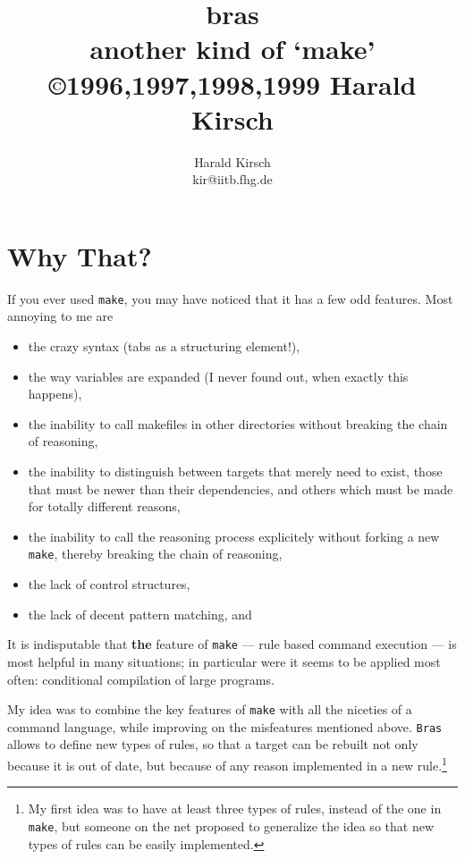 \documentclass[12pt]{article}
\title{\textsf{bras}\\
another kind of `make'\\
\small \copyright 1996,1997,1998,1999 Harald Kirsch}
\author{\relax
Harald Kirsch\\
kir@iitb.fhg.de}
\newcommand{\Bras}{\texttt{Bras}}
\newcommand{\make}{\texttt{make}}
\begin{document}
\maketitle
\tableofcontents







\section{Why That?}
If you ever used \texttt{make}, you may have noticed that it has a few
odd features. Most annoying to me are

\begin{itemize}
\item 
the crazy syntax (tabs as a structuring element!),
\item 
the way variables are expanded (I never found out, when exactly
this happens),
\item 
the inability to call makefiles in other directories without
breaking the chain of reasoning,
\item 
the inability to distinguish between targets that merely need to
  exist, those that must be newer than their dependencies, and others
  which must be made for totally different reasons,
\item the inability to call the reasoning process explicitely without
  forking a new \make, thereby breaking the chain of reasoning,
\item 
the lack of control structures,
\item 
the lack of decent pattern matching, and
\end{itemize}

It is indisputable that \textbf{the} feature of \texttt{make} ---
rule based command execution --- is most helpful in many situations;
in particular were it seems to be applied most often:
conditional compilation of large programs.

My idea was to combine the key features of \texttt{make} with all the
niceties of a command language, while improving on the misfeatures
mentioned above. \Bras{} allows to define new types of
rules, so that a target can be rebuilt not only because it is out of
date, but because of any reason implemented in a new rule.\footnote{My
first idea was to have at least three types of rules, instead of the one
in \make{}, but someone on the net proposed to generalize the idea so
that new types of rules can be easily implemented.}
\end{document}
